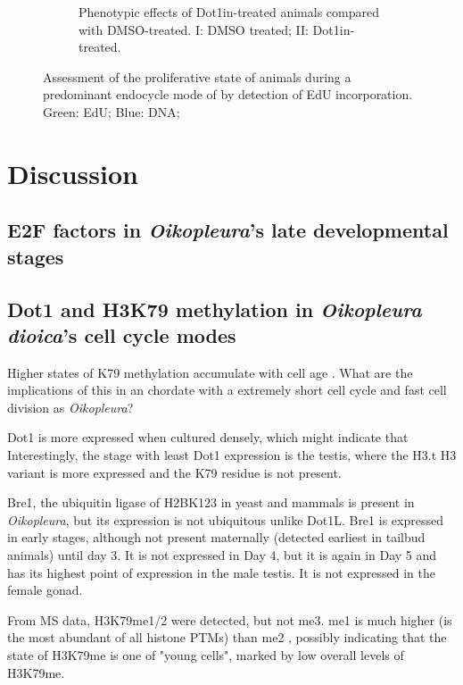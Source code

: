 \documentclass[11pt,twoside,a4paper]{report}
\begin{document}
\begin{figure}
\begin{subfigure}{0.8\textwidth}
			\caption{
				Phenotypic effects of Dot1in-treated animals compared with DMSO-treated.
				{\footnotesize
					I: DMSO treated;
					II: Dot1in-treated.
				}
			}
		\end{subfigure}
		\caption{Assessment of the proliferative state of animals during a predominant endocycle mode of by detection of EdU incorporation.
		Green: EdU;
		Blue: DNA;
		}
		\label{fig:Dot1in_D5}
	\end{figure}

\clearpage

\chapter{Discussion}

\section{E2F factors in \textit{Oikopleura}'s late developmental stages}


\section{Dot1 and H3K79 methylation in \textit{Oikopleura dioica}'s cell cycle modes}

Higher states of K79 methylation accumulate with cell age \cite{DeVos2011}. What are the implications of this in an chordate with a extremely short cell cycle and fast cell division as \textit{Oikopleura}?

Dot1 is more expressed when cultured densely, which might indicate that 
Interestingly, the stage with least Dot1 expression is the testis, where the H3.t H3 variant is more expressed and the K79 residue is not present.

Bre1, the ubiquitin ligase of H2BK123 in yeast and mammals is present in \textit{Oikopleura}, but its expression is not ubiquitous unlike Dot1L. Bre1 is expressed in early stages, although not present maternally (detected earliest in tailbud animals) until day 3. It is not expressed in Day 4, but it is again in Day 5 and has its highest point of expression in the male testis. It is not expressed in the female gonad.

From MS data, H3K79me1/2 were detected, but not me3. me1 is much higher (is the most abundant of all histone PTMs) than me2 \cite{Moosmann2011}, possibly indicating that the state of H3K79me is one of "young cells", marked by low overall levels of H3K79me.
\end{document}
